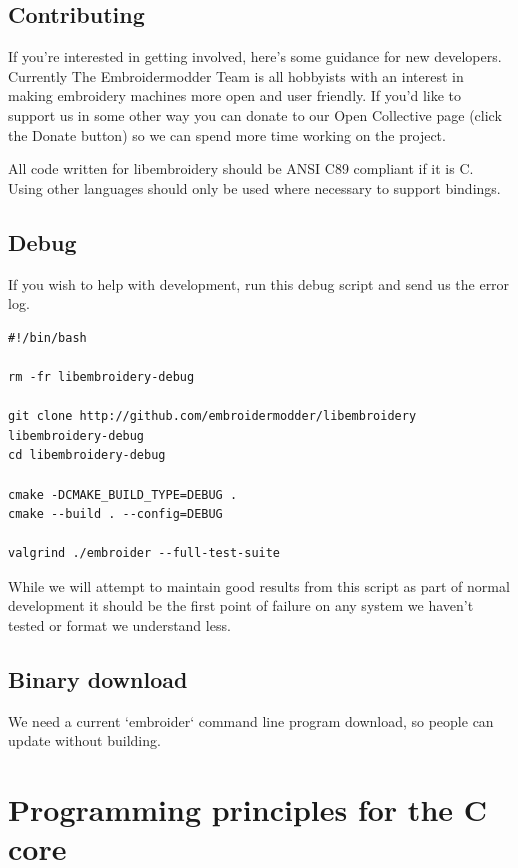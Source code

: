 \documentclass[10pt]{report}
\begin{document}
\subsection{Contributing}

If you're interested in getting involved, here's some guidance
for new developers. Currently The Embroidermodder Team is all
hobbyists with an interest in making embroidery machines more
open and user friendly. If you'd like to support us in some other way
you can donate to our Open Collective page (click the Donate button) so
we can spend more time working on the project.

All code written for libembroidery should be ANSI C89 compliant
if it is C. Using other languages should only be used where
necessary to support bindings.

\subsection{Debug}

If you wish to help with development, run this debug script and send us the
error log.

\begin{lstlisting}
#!/bin/bash

rm -fr libembroidery-debug

git clone http://github.com/embroidermodder/libembroidery libembroidery-debug
cd libembroidery-debug

cmake -DCMAKE_BUILD_TYPE=DEBUG .
cmake --build . --config=DEBUG

valgrind ./embroider --full-test-suite
\end{lstlisting}

While we will attempt to maintain good results from this script as part of
normal development it should be the first point of failure on any system we
haven't tested or format we understand less.

\subsection{Binary download}

We need a current `embroider` command line program download, so people can update
without building.

\section{Programming principles for the C core}
\end{document}
